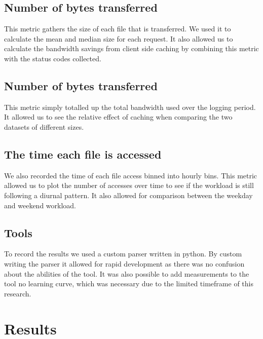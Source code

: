 \documentclass[10pt,conference]{IEEEtran}
\begin{document}
\subsection{Number of bytes transferred}
This metric gathers the size of each file that is transferred. We used it to calculate the mean and median size for each request. 
It also allowed us to calculate the bandwidth savings from client side caching by combining this metric with the status codes collected.

\subsection{Number of bytes transferred}
This metric simply totalled up the total bandwidth used over the logging period. It allowed us to see the relative effect of caching when comparing the two datasets of different sizes.

\subsection{The time each file is accessed}
We also recorded the time of each file access binned into hourly bins. This metric allowed us to plot the number of accesses over time to see if the workload is still following a diurnal pattern. It also allowed for comparison between the weekday and weekend workload.

\subsection{Tools}
To record the results we used a custom parser written in python. By custom writing the parser it allowed for rapid development as there was no confusion about the abilities of the tool. It was also possible to add measurements to the tool no learning curve, which was necessary due to the limited timeframe of this research.

\section{Results}\label{results}
\end{document}
